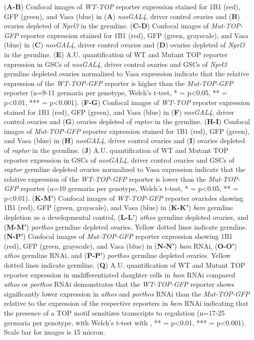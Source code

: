 \documentclass[12pt,oneside]{reedthesis}
\begin{document}
\setlength\parindent{0pt}(\textbf{A-B}) Confocal images of \emph{WT-TOP} reporter expression stained for 1B1 (red), GFP (green), and Vasa (blue) in (\textbf{A}) \emph{nosGAL4}, driver control ovaries and (\textbf{B}) ovaries depleted of \emph{Nprl3} in the germline. (\textbf{C-D}) Confocal images of \emph{Mut-TOP-GFP} reporter expression stained for 1B1 (red), GFP (green, grayscale), and Vasa (blue) in (\textbf{C}) \emph{nosGAL4}, driver control ovaries and (\textbf{D}) ovaries depleted of \emph{Nprl3} in the germline. (\textbf{E}) A.U. quantification of WT and Mutant TOP reporter expression in GSCs of \emph{nosGAL4}, driver control ovaries and GSCs of \emph{Nprl3} germline depleted ovaries normalized to Vasa expression indicate that the relative expression of the \emph{WT-TOP-GFP} reporter is higher than the \emph{Mut-TOP-GFP} reporter (n=9-11 germaria per genotype, Welch's t-test, * = p\textless0.05, ** = p\textless0.01, *** = p\textless0.001). (\textbf{F-G}) Confocal images of \emph{WT-TOP} reporter expression stained for 1B1 (red), GFP (green), and Vasa (blue) in (\textbf{F}) \emph{nosGAL4}, driver control ovaries and (\textbf{G}) ovaries depleted of \emph{raptor} in the germline. (\textbf{H-I}) Confocal images of \emph{Mut-TOP-GFP} reporter expression stained for 1B1 (red), GFP (green), and Vasa (blue) in (\textbf{H}) \emph{nosGAL4}, driver control ovaries and (\textbf{I}) ovaries depleted of \emph{raptor} in the germline. (\textbf{J}) A.U. quantification of WT and Mutant TOP reporter expression in GSCs of \emph{nosGAL4}, driver control ovaries and GSCs of \emph{raptor} germline depleted ovaries normalized to Vasa expression indicate that the relative expression of the \emph{WT-TOP-GFP} reporter is lower than the \emph{Mut-TOP-GFP} reporter (n=10 germaria per genotype, Welch's t-test, * = p\textless0.05, ** = p\textless0.01). (\textbf{K-M'}) Confocal images of \emph{WT-TOP-GFP} reporter ovarioles showing 1B1 (red), GFP (green, grayscale), and Vasa (blue) in (\textbf{K-K'}) \emph{bam} germline depletion as a developmental control, (\textbf{L-L'}) \emph{athos} germline depleted ovaries, and (\textbf{M-M'}) \emph{porthos} germline depleted ovaries. Yellow dotted lines indicate germline. (\textbf{N-P'}) Confocal images of \emph{Mut-TOP-GFP} reporter expression showing 1B1 (red), GFP (green, grayscale), and Vasa (blue) in (\textbf{N-N'}) \emph{bam} RNAi, (\textbf{O-O'}) \emph{athos} germline RNAi, and (\textbf{P-P'}) \emph{porthos} germline depleted ovaries. Yellow dotted lines indicate germline. (\textbf{Q}) A.U. quantification of WT and Mutant TOP reporter expression in undifferentiated daughter cells in \emph{bam} RNAi compared \emph{athos} or \emph{porthos} RNAi demonstrates that the \emph{WT-TOP-GFP} reporter shows significantly lower expression in \emph{athos} and \emph{porthos} RNAi than the \emph{Mut-TOP-GFP} relative to the expression of the respective reporters in \emph{bam} RNAi indicating that the presence of a TOP motif sensitizes transcripts to regulation (n=17-25 germaria per genotype, with Welch's t-test with , ** = p\textless0.01, *** = p\textless0.001). Scale bar for images is 15 micron.
\end{document}
